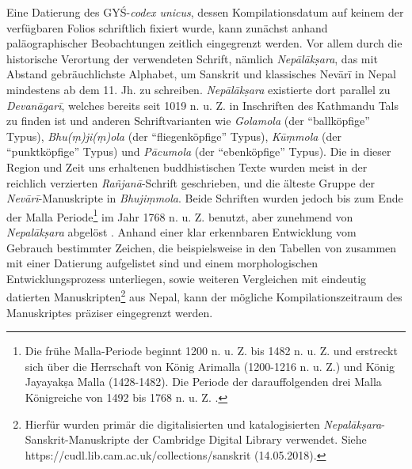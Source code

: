 \documentclass[a4paper,12pt]{article}
\begin{document}
{Eine Datierung des GYŚ-\textit{codex unicus}, dessen Kompilationsdatum auf keinem der verfügbaren Folios schriftlich fixiert wurde, kann zunächst anhand paläographischer Beobachtungen zeitlich eingegrenzt werden. Vor allem durch die historische Verortung der verwendeten Schrift, nämlich \textit{Nepālākṣara}, das mit Abstand gebräuchlichste Alphabet, um Sanskrit und klassisches Nevārī in Nepal mindestens ab dem 11. Jh. zu schreiben. \textit{Nepālākṣara} existierte dort parallel zu \textit{Devanāgarī}, welches bereits seit 1019 n. u. Z. in Inschriften des Kathmandu Tals zu finden ist und anderen Schriftvarianten wie \textit{Golamola} (der ``ballköpfige'' Typus), \textit{Bhu(ṃ)ji(ṃ)ola} (der ``fliegenköpfige'' Typus), \textit{Kūṃmola} (der ``punktköpfige'' Typus) und \textit{Pācumola} (der ``ebenköpfige'' Typus). Die in dieser Region und Zeit uns erhaltenen buddhistischen Texte wurden meist in der reichlich verzierten \textit{Rañjanā}-Schrift geschrieben, und die älteste Gruppe der \textit{Nevārī}-Manuskripte in \textit{Bhujiṃmola}. Beide Schriften wurden jedoch bis zum Ende der Malla Periode\footnote{Die frühe Malla-Periode beginnt 1200 n. u. Z.  bis 1482 n. u. Z. und erstreckt sich über die Herrschaft von König Arimalla (1200-1216 n. u. Z.) und König Jayayakṣa Malla (1428-1482). Die Periode der darauffolgenden drei Malla Königreiche von 1492 bis 1768 n. u. Z. \parencite[xi]{lienhard1988}.} im Jahr 1768 n. u. Z. benutzt, aber zunehmend von \textit{Nepalākṣara} abgelöst \parencite[xviii]{lienhard1988}.
Anhand einer klar erkennbaren Entwicklung vom Gebrauch bestimmter Zeichen, die beispielsweise in den Tabellen von \parencite{bendall1992} zusammen mit einer Datierung aufgelistet sind und einem morphologischen Entwicklungsprozess unterliegen, sowie weiteren Vergleichen mit eindeutig datierten Manuskripten\footnote{\raggedright{Hierfür wurden primär die digitalisierten und katalogisierten \textit{Nepalākṣara}-Sanskrit-Manuskripte der Cambridge Digital Library verwendet. Siehe https://cudl.lib.cam.ac.uk/collections/sanskrit (14.05.2018).}} aus Nepal, kann der mögliche Kompilationszeitraum des Manuskriptes präziser eingegrenzt werden.

}
\end{document}
